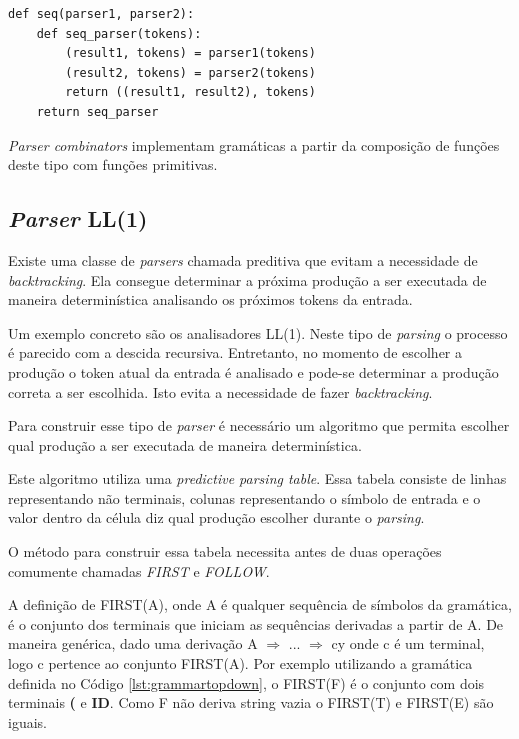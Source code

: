 \begin{lstlisting}[caption=Exemplo de combinador em pseudo-python,label={lst:seqcomb}]
def seq(parser1, parser2):
    def seq_parser(tokens):
        (result1, tokens) = parser1(tokens)
        (result2, tokens) = parser2(tokens)
        return ((result1, result2), tokens)
    return seq_parser
\end{lstlisting}

\textit{Parser combinators} implementam gramáticas a partir da composição de funções deste tipo
com funções primitivas.

\subsection{\textit{Parser} LL(1)}

Existe uma classe de \textit{parsers} chamada preditiva que evitam a necessidade de \textit{backtracking}. 
Ela consegue determinar a próxima produção a ser executada de maneira determinística 
analisando os próximos tokens da entrada.

Um exemplo concreto são os analisadores LL(1). Neste tipo de \textit{parsing} 
o processo é parecido com a descida recursiva. Entretanto, no momento de escolher 
a produção o token atual da entrada é analisado e pode-se determinar 
a produção correta a ser escolhida. Isto evita a necessidade de fazer \textit{backtracking}.

Para construir esse tipo de \textit{parser} é necessário um algoritmo 
que permita escolher qual produção a ser executada de maneira determinística.

Este algoritmo utiliza uma \textit{predictive parsing table}. Essa tabela consiste
de linhas representando não terminais, colunas representando o símbolo de entrada e o valor
dentro da célula diz qual produção escolher durante o \textit{parsing}. 

O método para construir essa tabela necessita antes de duas operações comumente chamadas \textit{FIRST} e 
\textit{FOLLOW}.

A definição de FIRST(A), onde A é qualquer sequência de símbolos da gramática, 
é o conjunto dos terminais que iniciam as 
sequências derivadas a partir de A. 
De maneira genérica, dado uma derivação A $\Rightarrow$ ... $\Rightarrow$ cy onde c é um terminal, logo
c pertence ao conjunto FIRST(A).
Por exemplo utilizando a gramática definida no Código \ref{lst:grammartopdown}, o FIRST(F) é o conjunto com
dois terminais \textbf{(} e \textbf{ID}. Como F não deriva string vazia o FIRST(T) e FIRST(E) são iguais.

